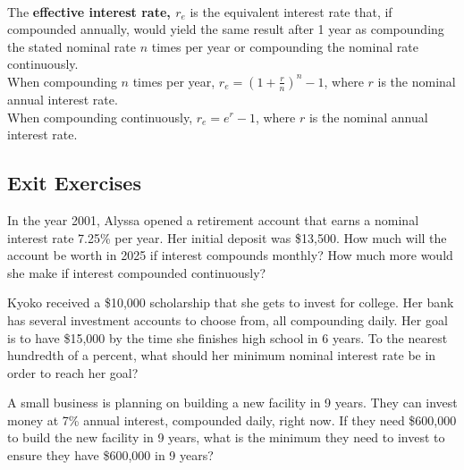 \begin{myDefinition}~\\[0.5mm]
The \textbf{effective interest rate, ${r_e}$} is the equivalent interest rate that, if compounded annually, would yield the same result after 1 year as compounding the stated nominal rate $n$ times per year or compounding the nominal rate continuously.\\[0.5em]
When compounding $n$ times per year, $r_e = \left(1 + \frac{r}{n}\right)^n - 1$, where $r$ is the nominal annual interest rate.\\
When compounding continuously, $r_e = e^r - 1$, where $r$ is the nominal annual interest rate.\\


\end{myDefinition}




 \newpage

\subsection*{Exit Exercises} \label{exit-exponential-compounding}

\begin{myExit}
In the year 2001, Alyssa opened a retirement account that earns a nominal interest rate 7.25\% per year. Her initial deposit was \$13,500. How much will the account be worth in 2025 if interest compounds monthly? How much more would she make if interest compounded continuously?\end{myExit}
\vfill

\begin{myExit}
Kyoko received a \$10,000 scholarship that she gets to invest for college.  Her bank has several investment accounts to choose from, all compounding daily.  Her goal is to have \$15,000 by the time she finishes high school in 6 years.  To the nearest hundredth of a percent, what should her minimum nominal interest rate be in order to reach her goal? 
\end{myExit}
\vfill

\begin{myExit}
A small business is planning on building a new facility in 9 years. They can invest money at 7\% annual interest, compounded daily, right now. If they need \$600,000 to build the new facility in 9 years, what is the minimum they need to invest to ensure they have \$600,000 in 9 years?
\end{myExit}
\vfill













